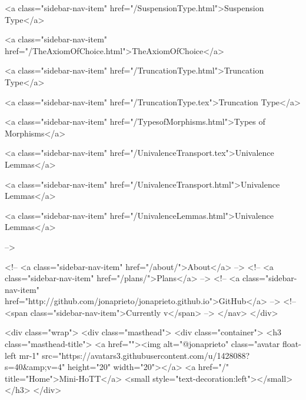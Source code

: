      
    
      
        
          <a class="sidebar-nav-item" href="/SuspensionType.html">Suspension Type</a>
        
      
    
      
        
          <a class="sidebar-nav-item" href="/TheAxiomOfChoice.html">TheAxiomOfChoice</a>
        
      
    
      
        
          <a class="sidebar-nav-item" href="/TruncationType.html">Truncation Type</a>
        
      
    
      
        
          <a class="sidebar-nav-item" href="/TruncationType.tex">Truncation Type</a>
        
      
    
      
        
          <a class="sidebar-nav-item" href="/TypesofMorphisms.html">Types of Morphisms</a>
        
      
    
      
        
          <a class="sidebar-nav-item" href="/UnivalenceTransport.tex">Univalence Lemmas</a>
        
      
    
      
        
          <a class="sidebar-nav-item" href="/UnivalenceTransport.html">Univalence Lemmas</a>
        
      
    
      
        
          <a class="sidebar-nav-item" href="/UnivalenceLemmas.html">Univalence Lemmas</a>
        
      
     -->

    <!-- <a class="sidebar-nav-item" href="/about/">About</a> -->
    <!-- <a class="sidebar-nav-item" href="/plans/">Plans</a> -->
    <!-- <a class="sidebar-nav-item" href="http://github.com/jonaprieto/jonaprieto.github.io">GitHub</a> -->
    <!-- <span class="sidebar-nav-item">Currently v</span> -->
  </nav>
</div>

    <div class="wrap">
      <div class="masthead">
        <div class="container">
          <h3 class="masthead-title">
            <a href=""><img alt="@jonaprieto" class="avatar float-left mr-1" src="https://avatars3.githubusercontent.com/u/1428088?s=40&amp;v=4" height="20" width="20"></a>
            <a href="/" title="Home">Mini-HoTT</a>
            <small style="text-decoration:left"></small>
          </h3>
        </div>
      
